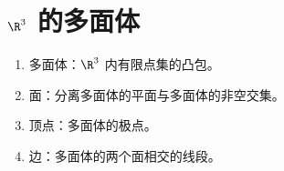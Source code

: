 \chapter{\(\R^{3}\) 的多面体}

\begin{enumerate}
    \item 多面体：\(\R^{3} \) 内有限点集的凸包。
    \item 面：分离多面体的平面与多面体的非空交集。
    \item 顶点：多面体的极点。
    \item 边：多面体的两个面相交的线段。
\end{enumerate}